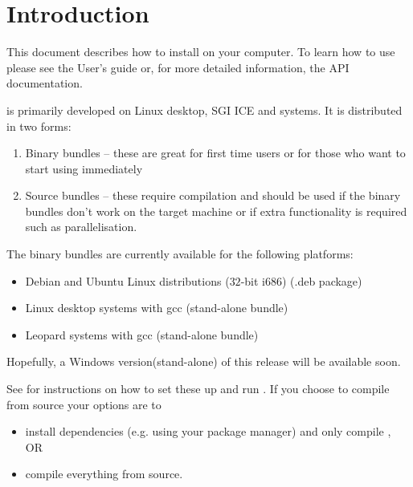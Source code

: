 %
%
%

\chapter{Introduction}
This document describes how to install \esfinley on your computer.
To learn how to use \esfinley please see the User's guide or, for more detailed
information, the API documentation.

\esfinley is primarily developed on Linux desktop, SGI ICE and \macosx systems.
It is distributed in two forms:
\begin{enumerate}
    \item Binary bundles -- these are great for first time users or for those who want to start using \esfinley immediately
    \item Source bundles -- these require compilation and should be used if the binary bundles don't work on the target machine or if extra functionality is required such as \mpi parallelisation.
\end{enumerate}

The binary bundles are currently available for the following platforms:
\begin{itemize}
    \item Debian and Ubuntu Linux distributions ($32$-bit i686) (.deb package)
    \item Linux desktop systems with gcc (stand-alone bundle)
    \item \macosx Leopard systems with gcc (stand-alone bundle)
\end{itemize}

Hopefully, a Windows version(stand-alone) of this release will be available soon.

See  for instructions on how to set these up and run \esfinley.
If you choose to compile from source your options are to
\begin{itemize}
    \item install dependencies (e.g. using your package manager) and only compile \esfinley, OR
    \item compile everything from source.
\end{itemize}

